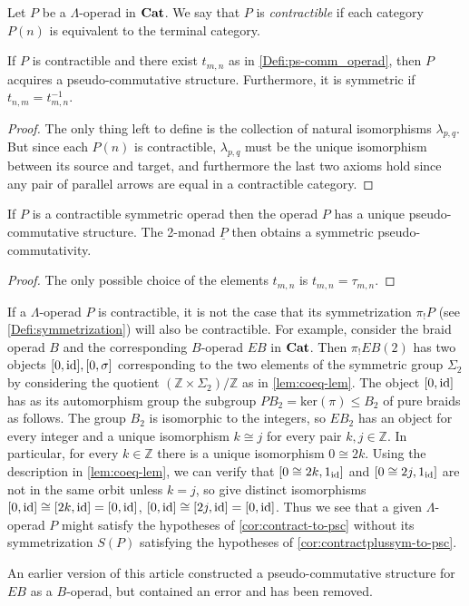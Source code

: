 \begin{Defi}
Let $P$ be a $\Lambda$-operad in $\mathbf{Cat}$. We say that $P$ is \textit{contractible} if each category $P(n)$ is equivalent to the terminal category.
\end{Defi}

\begin{cor}\label{cor:contract-to-psc}
If $P$ is contractible and there exist $t_{m,n}$ as in \cref{Defi:ps-comm_operad}, then $P$ acquires a pseudo-commutative structure. Furthermore, it is symmetric if $t_{n,m} = t_{m,n}^{-1}$.
\end{cor}
\begin{proof}
The only thing left to define is the collection of natural isomorphisms $\lambda_{p,q}$. But since each $P(n)$ is contractible, $\lambda_{p,q}$ must be the unique isomorphism between its source and target, and furthermore the last two axioms hold since any pair of parallel arrows are equal in a contractible category.
\end{proof}

\begin{cor}\label{cor:contractplussym-to-psc}
If $P$ is a contractible symmetric operad then the operad $P$ has a unique pseudo-commutative structure. The 2-monad $\underline{P}$ then obtains a symmetric pseudo-commutativity.
\end{cor}
\begin{proof}
The only possible choice of the elements $t_{m,n}$ is $t_{m,n} = \tau_{m,n}$.
\end{proof}

\begin{rem}\label{rem:symm-and-contract}
If a $\Lambda$-operad $P$ is contractible, it is not the case that its symmetrization $\pi_{!}P$ (see \cref{Defi:symmetrization}) will also be contractible. For example, consider the braid operad $B$ and the corresponding $B$-operad $EB$ in $\mathbf{Cat}$. Then $\pi_{!}EB(2)$ has two objects $[0,\textrm{id}], [0,\sigma]$ corresponding to the two elements of the symmetric group $\Sigma_2$ by considering the quotient $(\mathbb{Z} \times \Sigma_2)/\mathbb{Z}$ as in \cref{lem:coeq-lem}. The object $[0,\textrm{id}]$ has as its automorphism group the subgroup $PB_2 = \textrm{ker}(\pi) \leq B_2$ of pure braids as follows. The group $B_2$ is isomorphic to the integers, so $EB_2$ has an object for every integer and a unique isomorphism $k \cong j$ for every pair $k, j \in \mathbb{Z}$. In particular, for every $k \in \mathbb{Z}$ there is a unique isomorphism $0 \cong 2k$. Using the description in \cref{lem:coeq-lem}, we can verify that $[0 \cong 2k, 1_{\textrm{id}}]$ and $[0 \cong 2j, 1_{\textrm{id}}]$ are not in the same orbit unless $k=j$, so give distinct isomorphisms $[0, \textrm{id}] \cong [2k, \textrm{id}] = [0, \textrm{id}]$, $[0, \textrm{id}] \cong [2j, \textrm{id}] = [0, \textrm{id}]$.
Thus we see that a given $\Lambda$-operad $P$ might satisfy the hypotheses of \cref{cor:contract-to-psc} without its symmetrization $S(P)$ satisfying the hypotheses of \cref{cor:contractplussym-to-psc}.
\end{rem}

\begin{rem}\label{rem:EB-fail}
An earlier version of this article \cite{cg-preprint} constructed a pseudo-commutative structure for $EB$ as a $B$-operad, but contained an error and has been removed.
\end{rem}


